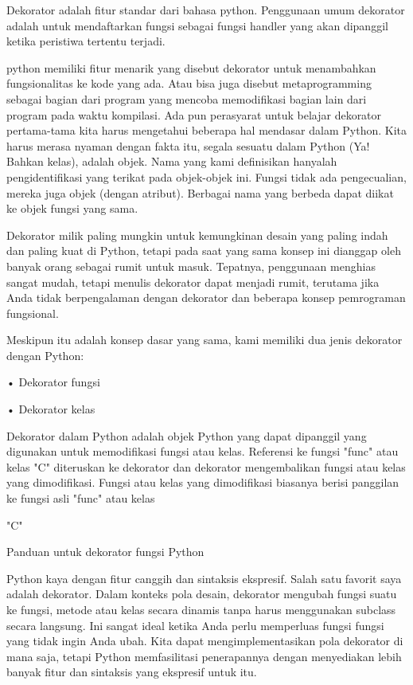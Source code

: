 \documentclass[12pt,a4paper]{article}
\begin{document}
Dekorator adalah fitur standar dari bahasa python. Penggunaan umum dekorator adalah untuk mendaftarkan fungsi sebagai fungsi handler yang akan dipanggil ketika peristiwa tertentu terjadi.



python memiliki fitur menarik yang disebut dekorator untuk menambahkan fungsionalitas ke kode yang ada. Atau bisa juga disebut metaprogramming sebagai bagian dari program yang mencoba memodifikasi bagian lain dari program pada waktu kompilasi. Ada pun perasyarat untuk belajar dekorator pertama-tama kita harus mengetahui beberapa hal mendasar dalam Python. Kita harus merasa nyaman dengan fakta itu, segala sesuatu dalam Python (Ya! Bahkan kelas), adalah objek. Nama yang kami definisikan hanyalah pengidentifikasi yang terikat pada objek-objek ini. Fungsi tidak ada pengecualian, mereka juga objek (dengan atribut). Berbagai nama yang berbeda dapat diikat ke objek fungsi yang sama.



Dekorator milik paling mungkin untuk kemungkinan desain yang paling indah dan paling kuat di Python, tetapi pada saat yang sama konsep ini dianggap oleh banyak orang sebagai rumit untuk masuk. Tepatnya, penggunaan menghias sangat mudah, tetapi menulis dekorator dapat menjadi rumit, terutama jika Anda tidak berpengalaman dengan dekorator dan beberapa konsep pemrograman fungsional. 



Meskipun itu adalah konsep dasar yang sama, kami memiliki dua jenis dekorator dengan Python:

•	Dekorator fungsi

•	Dekorator kelas

Dekorator dalam Python adalah objek Python yang dapat dipanggil yang digunakan untuk memodifikasi fungsi atau kelas. Referensi ke fungsi "func" atau kelas "C" diteruskan ke dekorator dan dekorator mengembalikan fungsi atau kelas yang dimodifikasi. Fungsi atau kelas yang dimodifikasi biasanya berisi panggilan ke fungsi asli "func" atau kelas 

"C"





Panduan untuk dekorator fungsi Python

Python kaya dengan fitur canggih dan sintaksis ekspresif. Salah satu favorit saya adalah dekorator. Dalam konteks pola desain, dekorator mengubah fungsi suatu ke fungsi, metode atau kelas secara dinamis tanpa harus menggunakan subclass secara langsung. Ini sangat ideal ketika Anda perlu memperluas fungsi fungsi yang tidak ingin Anda ubah. Kita dapat mengimplementasikan pola dekorator di mana saja, tetapi Python memfasilitasi penerapannya dengan menyediakan lebih banyak fitur dan sintaksis yang ekspresif untuk itu.
\end{document}
